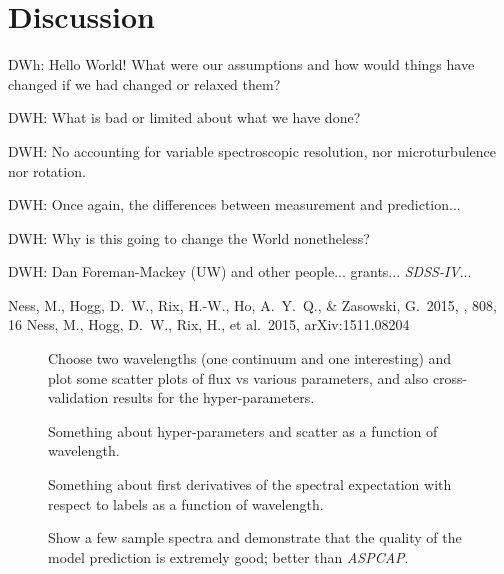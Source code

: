 \documentclass[12pt,preprint]{aastex}
\newcommand{\project}[1]{\textsl{#1}}
\newcommand{\acronym}[1]{{\small{#1}}}
\newcommand{\sdss}{\project{\acronym{SDSS-IV}}}
\newcommand{\aspcap}{\project{\acronym{ASPCAP}}}
\begin{document}
\section{Discussion}

DWh:  Hello World!  What were our assumptions and how would things have
changed if we had changed or relaxed them?

DWH:  What is bad or limited about what we have done?

DWH: No accounting for variable spectroscopic resolution, nor
microturbulence nor rotation.

DWH:  Once again, the differences between measurement and prediction...

DWH:  Why is this going to change the World nonetheless?

\acknowledgements
DWH: Dan Foreman-Mackey (UW) and other people...
grants...
\sdss...

\begin{thebibliography}{dummy}
 Ness, M., Hogg, D.~W., 
Rix, H.-W., Ho, A.~Y.~Q., \& Zasowski, G.\ 2015, \apj, 808, 16
 Ness, M., Hogg, D.~W., 
Rix, H., et al.\ 2015, arXiv:1511.08204 
\end{thebibliography}

\clearpage

\begin{figure}[p]
\caption{Choose two wavelengths (one continuum and one interesting)
  and plot some scatter plots of flux vs various parameters, and also
  cross-validation results for the
  hyper-parameters.\label{fig:onewavelength}}
\end{figure}

\begin{figure}[p]
\caption{Something about hyper-parameters and scatter as a function of
  wavelength.\label{fig:hyperpars}}
\end{figure}

\begin{figure}[p]
\caption{Something about first derivatives of the spectral expectation
  with respect to labels as a function of
  wavelength.\label{fig:derivatives}}
\end{figure}

\begin{figure}[p]
\caption{Show a few sample spectra and demonstrate that the quality of
  the model prediction is extremely good; better than
  \aspcap.\label{fig:correctness}}
\end{figure}
\end{document}
